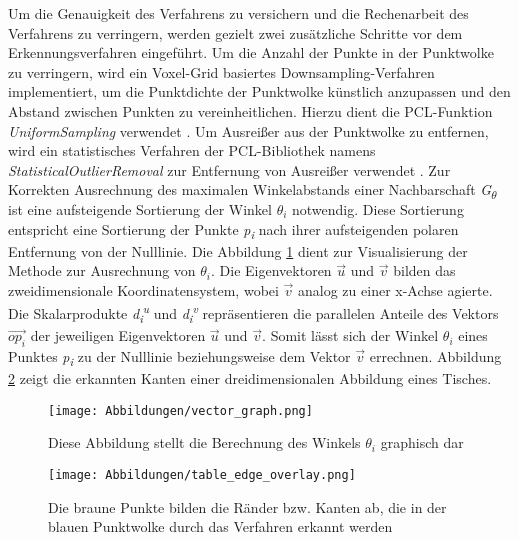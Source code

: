 Um die Genauigkeit des Verfahrens zu versichern und die Rechenarbeit des Verfahrens zu verringern, werden gezielt zwei zusätzliche Schritte vor dem Erkennungsverfahren eingeführt. Um die Anzahl der Punkte in der Punktwolke zu verringern, wird ein Voxel-Grid basiertes Downsampling-Verfahren implementiert, um die Punktdichte der Punktwolke künstlich anzupassen und den Abstand zwischen Punkten zu vereinheitlichen. Hierzu dient die PCL-Funktion \textit{UniformSampling} verwendet \autocite{noauthor_point_2023}. Um Ausreißer aus der Punktwolke zu entfernen, wird ein statistisches Verfahren der PCL-Bibliothek namens \textit{StatisticalOutlierRemoval} zur Entfernung von Ausreißer verwendet \autocite{rusu_towards_2008}. Zur Korrekten Ausrechnung des maximalen Winkelabstands einer Nachbarschaft \textit{G\textsubscript{$\theta$}} ist eine aufsteigende Sortierung der Winkel \textit{$\theta_i$} notwendig. Diese Sortierung entspricht eine Sortierung der Punkte \textit{p\textsubscript{i}} nach ihrer aufsteigenden polaren Entfernung von der Nulllinie. Die Abbildung \ref{vector_graph} dient zur Visualisierung der Methode zur Ausrechnung von $\theta_i$. Die Eigenvektoren $\vec{u}$ und $\vec{v}$ bilden das zweidimensionale Koordinatensystem, wobei $\vec{v}$ analog zu einer x-Achse agierte. Die Skalarprodukte \textit{d\textsubscript{i}\textsuperscript{u}} und \textit{d\textsubscript{i}\textsuperscript{v}} repräsentieren die parallelen Anteile des Vektors $\vec{{op}_i}$ der jeweiligen Eigenvektoren $\vec{u}$ und $\vec{v}$. Somit lässt sich der Winkel $\theta_i$ eines Punktes \textit{p\textsubscript{i}} zu der Nulllinie beziehungsweise dem Vektor $\vec{v}$ errechnen. Abbildung \ref{edge_points_table} zeigt die erkannten Kanten einer dreidimensionalen Abbildung eines Tisches.

\begin{figure}[h]
	\texttt{[image: Abbildungen/vector\_graph.png]}
	\centering
	\caption{Diese Abbildung stellt die Berechnung des Winkels $\theta_i$ graphisch dar}
	\label{vector_graph}
\end{figure}

\begin{figure}[h]
	\texttt{[image: Abbildungen/table\_edge\_overlay.png]}
	\centering
	\caption{Die braune Punkte bilden die Ränder bzw. Kanten ab, die in der blauen Punktwolke durch das Verfahren erkannt werden}
	\label{edge_points_table}
\end{figure}

